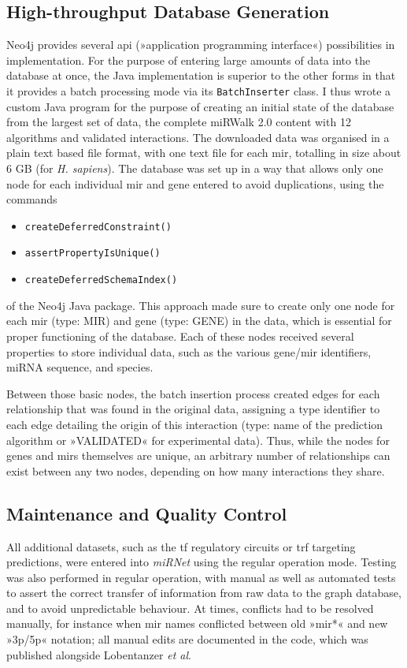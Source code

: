 \subsection{High-throughput Database Generation}
Neo4j provides several \acs{api} (»application programming interface«) possibilities in implementation. For the purpose of entering large amounts of data into the database at once, the Java implementation is superior to the other forms in that it provides a batch processing mode via its \texttt{BatchInserter} class. I thus wrote a custom Java program for the purpose of creating an initial state of the database from the largest set of data, the complete miRWalk 2.0 content with 12 algorithms and validated interactions. The downloaded data was organised in a plain text based file format, with one text file for each \ac{mir}, totalling in size about 6 GB (for \textit{H. sapiens}). The database was set up in a way that allows only one node for each individual \ac{mir} and gene entered to avoid duplications, using the commands 
\begin{itemize}[noitemsep, leftmargin=.5cm, label={\tiny\raisebox{1ex}{\textbullet}}]
\item \texttt{createDeferredConstraint()}
\item \texttt{assertPropertyIsUnique()}
\item \texttt{createDeferredSchemaIndex()} 
\end{itemize}
of the Neo4j Java package. This approach made sure to create only one node for each \ac{mir} (type: MIR) and gene (type: GENE) in the data, which is essential for proper functioning of the database. Each of these nodes received several properties to store individual data, such as the various gene/\ac{mir} identifiers, miRNA sequence, and species. 

Between those basic nodes, the batch insertion process created edges for each relationship that was found in the original data, assigning a type identifier to each edge detailing the origin of this interaction (type: name of the prediction algorithm or »VALIDATED« for experimental data). Thus, while the nodes for genes and \acp{mir} themselves are unique, an arbitrary number of relationships can exist between any two nodes, depending on how many interactions they share.

\subsection{Maintenance and Quality Control}
All additional datasets, such as the \ac{tf} regulatory circuits or \ac{trf} targeting predictions, were entered into \textit{miRNet} using the regular operation mode. Testing was also performed in regular operation, with manual as well as automated tests to assert the correct transfer of information from raw data to the graph database, and to avoid unpredictable behaviour. At times, conflicts had to be resolved manually, for instance when \ac{mir} names conflicted between old »\ac{mir}*« and new »3p/5p« notation; all manual edits are documented in the code, which was published alongside Lobentanzer \emph{et al}.\cite{Lobentanzer2019a}

